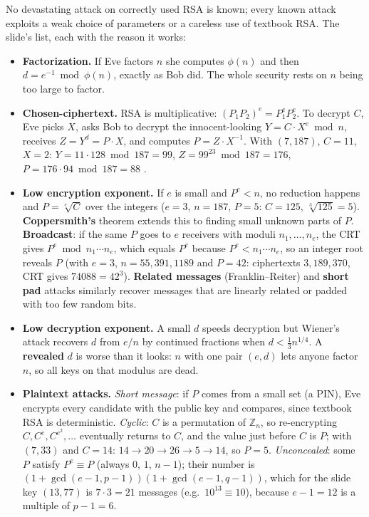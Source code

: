 No devastating attack on correctly used RSA is known; every known attack exploits a weak choice of parameters or a careless use of textbook RSA. The slide's list, each with the reason it works:
\begin{itemize}[leftmargin=1.4em]
  \item \textbf{Factorization.} If Eve factors $n$ she computes $\phi(n)$ and then $d = e^{-1} \bmod \phi(n)$, exactly as Bob did. The whole security rests on $n$ being too large to factor.
  \item \textbf{Chosen-ciphertext.} RSA is multiplicative: $(P_1 P_2)^e = P_1^e P_2^e$. To decrypt $C$, Eve picks $X$, asks Bob to decrypt the innocent-looking $Y = C \cdot X^e \bmod n$, receives $Z = Y^d = P \cdot X$, and computes $P = Z \cdot X^{-1}$. With $(7, 187)$, $C = 11$, $X = 2$: $Y = 11 \cdot 128 \bmod 187 = 99$, $Z = 99^{23} \bmod 187 = 176$, $P = 176 \cdot 94 \bmod 187 = 88$ \checkmark.
  \item \textbf{Low encryption exponent.} If $e$ is small and $P^e < n$, no reduction happens and $P = \sqrt[e]{C}$ over the integers ($e = 3$, $n = 187$, $P = 5$: $C = 125$, $\sqrt[3]{125} = 5$). \textbf{Coppersmith's} theorem extends this to finding small unknown parts of $P$. \textbf{Broadcast}: if the same $P$ goes to $e$ receivers with moduli $n_1, \dots, n_e$, the CRT gives $P^e \bmod n_1 \cdots n_e$, which equals $P^e$ because $P^e < n_1 \cdots n_e$, so an integer root reveals $P$ (with $e = 3$, $n = 55, 391, 1189$ and $P = 42$: ciphertexts $3, 189, 370$, CRT gives $74088 = 42^3$). \textbf{Related messages} (Franklin--Reiter) and \textbf{short pad} attacks similarly recover messages that are linearly related or padded with too few random bits.
  \item \textbf{Low decryption exponent.} A small $d$ speeds decryption but Wiener's attack recovers $d$ from $e/n$ by continued fractions when $d < \tfrac{1}{3} n^{1/4}$. A \textbf{revealed} $d$ is worse than it looks: $n$ with one pair $(e, d)$ lets anyone factor $n$, so all keys on that modulus are dead.
  \item \textbf{Plaintext attacks.} \emph{Short message}: if $P$ comes from a small set (a PIN), Eve encrypts every candidate with the public key and compares, since textbook RSA is deterministic. \emph{Cyclic}: $C$ is a permutation of $\mathbb{Z}_n$, so re-encrypting $C, C^e, C^{e^2}, \dots$ eventually returns to $C$, and the value just before $C$ is $P$; with $(7, 33)$ and $C = 14$: $14 \to 20 \to 26 \to 5 \to 14$, so $P = 5$. \emph{Unconcealed}: some $P$ satisfy $P^e \equiv P$ (always $0$, $1$, $n - 1$); their number is $(1 + \gcd(e-1, p-1))(1 + \gcd(e-1, q-1))$, which for the slide key $(13, 77)$ is $7 \cdot 3 = 21$ messages (e.g.\ $10^{13} \equiv 10$), because $e - 1 = 12$ is a multiple of $p - 1 = 6$.

\end{itemize}
